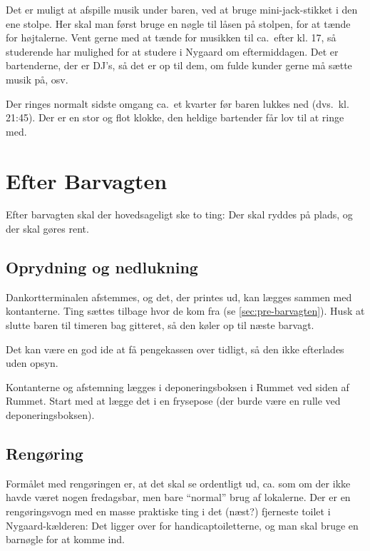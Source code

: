 Det er muligt at afspille musik under baren, ved at bruge
mini-jack-stikket i den ene stolpe. Her skal man først bruge en nøgle
til låsen på stolpen, for at tænde for højtalerne. Vent gerne med at
tænde for musikken til ca.\ efter kl. 17, så studerende har mulighed
for at studere i Nygaard om eftermiddagen. Det er bartenderne, der er
DJ's, så det er op til dem, om fulde kunder gerne må sætte musik på,
osv.

Der ringes normalt sidste omgang ca.\ et kvarter før baren lukkes ned
(dvs.\ kl. 21:45). Der er en stor og flot klokke, den heldige bartender
får lov til at ringe med.

\section{Efter Barvagten}
\label{sec:post-barvagten}

Efter barvagten skal der hovedsageligt ske to ting: Der skal ryddes på
plads, og der skal gøres rent.

\subsection{Oprydning og nedlukning}
\label{sec:post:oprydning}

Dankortterminalen afstemmes, og det, der printes ud, kan lægges sammen
med kontanterne. Ting sættes tilbage hvor de kom fra (se
\autoref{sec:pre-barvagten}). Husk at slutte baren til timeren bag gitteret, så den
køler op til næste barvagt.

Det kan være en god ide at få
pengekassen over tidligt, så den ikke efterlades uden opsyn.

Kontanterne og afstemning lægges i deponeringsboksen i Rummet ved
siden af Rummet. Start med at lægge det i en frysepose (der burde være
en rulle ved deponeringsboksen).

\subsection{Rengøring}
\label{sec:post:rengoring}

Formålet med rengøringen er, at det skal se ordentligt ud, ca. som om
der ikke havde været nogen fredagsbar, men bare ``normal'' brug af
lokalerne. Der er en rengøringsvogn med en masse praktiske ting i det
(næst?) fjerneste toilet i Nygaard-kælderen: Det ligger over for
handicaptoiletterne, og man skal bruge en barnøgle for at komme ind.

